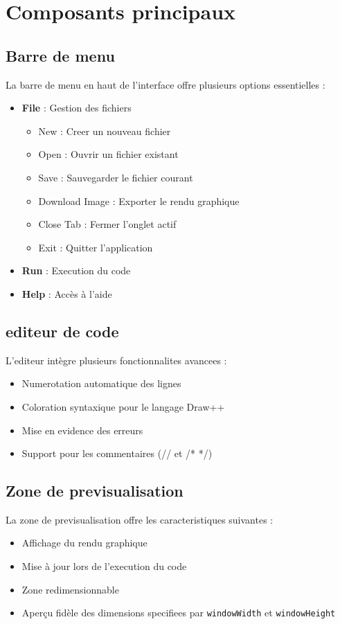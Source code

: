 \documentclass[12pt,a4paper]{report}
\begin{document}
\section{Composants principaux}

\subsection{Barre de menu}
La barre de menu en haut de l'interface offre plusieurs options essentielles :
\begin{itemize}
    \item \textbf{File} : Gestion des fichiers
    \begin{itemize}
        \item New : Creer un nouveau fichier
        \item Open : Ouvrir un fichier existant
        \item Save : Sauvegarder le fichier courant
        \item Download Image : Exporter le rendu graphique
        \item Close Tab : Fermer l'onglet actif
        \item Exit : Quitter l'application
    \end{itemize}
    \item \textbf{Run} : Execution du code
    \item \textbf{Help} : Accès à l'aide
\end{itemize}

\subsection{editeur de code}
L'editeur intègre plusieurs fonctionnalites avancees :
\begin{itemize}
    \item Numerotation automatique des lignes
    \item Coloration syntaxique pour le langage Draw++
    \item Mise en evidence des erreurs
    \item Support pour les commentaires (// et /* */)
\end{itemize}

\subsection{Zone de previsualisation}
La zone de previsualisation offre les caracteristiques suivantes :
\begin{itemize}
    \item Affichage du rendu graphique
    \item Mise à jour lors de l'execution du code
    \item Zone redimensionnable
    \item Aperçu fidèle des dimensions specifiees par \texttt{windowWidth} et \texttt{windowHeight}
\end{itemize}
\newpage
\end{document}
